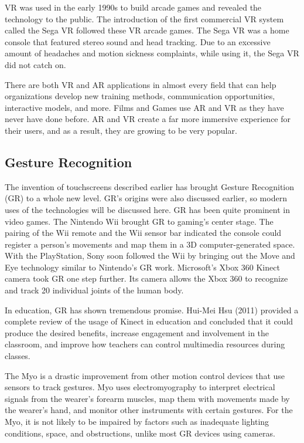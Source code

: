 \documentclass{article}
\begin{document}
VR was used in the early 1990s to build arcade games and revealed the technology to the public. The introduction of the first commercial VR system called the Sega VR followed these VR arcade games. The Sega VR was a home console that featured stereo sound and head tracking. Due to an excessive amount of headaches and motion sickness complaints, while using it, the Sega VR did not catch on.

There are both VR and AR applications in almost every field that can help organizations develop new training methods, communication opportunities, interactive models, and more. Films and Games use AR and VR as they have never have done before. AR and VR create a far more immersive experience for their users, and as a result, they are growing to be very popular. 
\cite{ref11}

\subsection{Gesture Recognition}
The invention of touchscreens described earlier has brought Gesture Recognition (GR) to a whole new level. GR’s origins were also discussed earlier, so modern uses of the technologies will be discussed here. GR has been quite prominent in video games. The Nintendo Wii brought GR to gaming’s center stage. The pairing of the Wii remote and the Wii sensor bar indicated the console could register a person’s movements and map them in a 3D computer-generated space. With the PlayStation, Sony soon followed the Wii by bringing out the Move and Eye technology similar to Nintendo’s GR work. Microsoft’s Xbox 360 Kinect camera took GR one step further. Its camera allows the Xbox 360 to recognize and track 20 individual joints of the human body. 
\cite{ref12}

In education, GR has shown tremendous promise. Hui-Mei Hsu (2011) provided a complete review of the usage of Kinect in education and concluded that it could produce the desired benefits, increase engagement and involvement in the classroom, and improve how teachers can control multimedia resources during classes.

The Myo is a drastic improvement from other motion control devices that use sensors to track gestures. Myo uses electromyography to interpret electrical signals from the wearer’s forearm muscles, map them with movements made by the wearer's hand, and monitor other instruments with certain gestures. For the Myo, it is not likely to be impaired by factors such as inadequate lighting conditions, space, and obstructions, unlike most GR devices using cameras. 
\cite{ref13}
\end{document}

